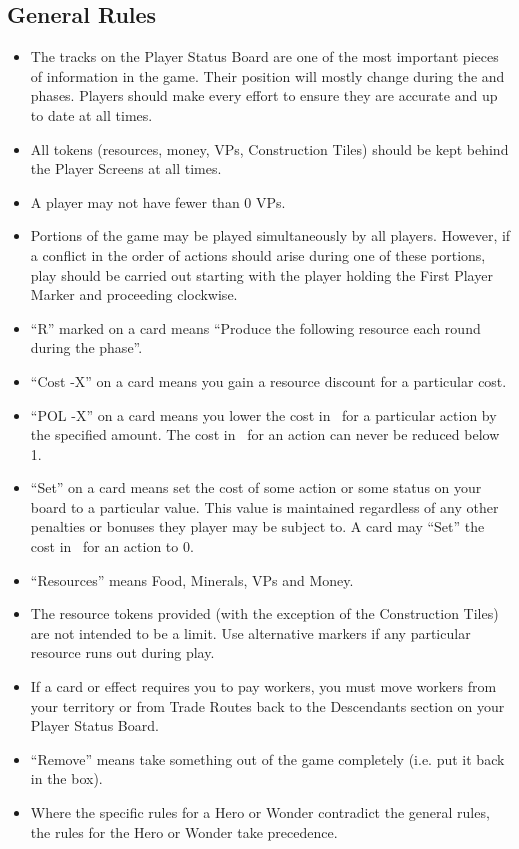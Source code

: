 \documentclass[10pt,twocolumn]{article}
\begin{document}
\subsection{General Rules}
\begin{itemize}
\item The tracks on the Player Status Board are one of the most important pieces of information in the game. Their position will mostly change during the  and  phases. Players should make every effort to ensure they are accurate and up to date at all times.

\item All tokens (resources, money, VPs, Construction Tiles) should be kept behind the Player Screens at all times.

\item A player may not have fewer than 0 VPs.

\item Portions of the game may be played simultaneously by all players. However, if a conflict in the order of actions should arise during one of these portions, play should be carried out starting with the player holding the First Player Marker and proceeding clockwise.

\item ``R'' marked on a card means ``Produce the following resource each round during the  phase''.

\item ``Cost -X'' on a card means you gain a resource discount for a particular cost.

\item ``POL -X'' on a card means you lower the cost in \polf\ for a particular action by the specified amount. The cost in \polf\ for an action can never be reduced below 1.

\item ``Set'' on a card means set the cost of some action or some status on your board to a particular value. This value is maintained regardless of any other penalties or bonuses they player may be subject to. A card may ``Set'' the cost in \polf\ for an action to 0.

\item ``Resources'' means Food, Minerals, VPs and Money.

\item The resource tokens provided (with the exception of the Construction Tiles) are not intended to be a limit. Use alternative markers if any particular resource runs out during play.

\item If a card or effect requires you to pay workers, you must move workers from your territory or from Trade Routes back to the Descendants section on your Player Status Board.

\item ``Remove'' means take something out of the game completely (i.e. put it back in the box).
\item Where the specific rules for a Hero or Wonder contradict the general rules, the rules for the Hero or Wonder take precedence.
\end{itemize}
\end{document}
